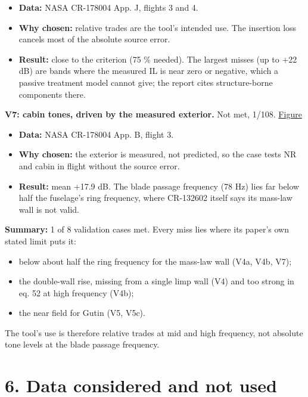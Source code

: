 \documentclass[10pt,a4paper]{article}
\begin{document}
\begin{itemize}
\item \textbf{Data:} NASA CR-178004 App. J, flights 3 and 4.
\item \textbf{Why chosen:} relative trades are the tool's intended use. The insertion loss cancels most of the absolute source error.
\item \textbf{Result:} close to the criterion (75 \% needed). The largest misses (up to +22 dB) are bands where the measured IL is near zero or negative, which a passive treatment model cannot give; the report cites structure-borne components there.
\end{itemize}

\textbf{V7: cabin tones, driven by the measured exterior.} Not met, 1/108. \href{../figures/V7.png}{Figure}

\begin{itemize}
\item \textbf{Data:} NASA CR-178004 App. B, flight 3.
\item \textbf{Why chosen:} the exterior is measured, not predicted, so the case tests NR and cabin in flight without the source error.
\item \textbf{Result:} mean +17.9 dB. The blade passage frequency (78 Hz) lies far below half the fuselage's ring frequency, where CR-132602 itself says its mass-law wall is not valid.
\end{itemize}

\textbf{Summary:} 1 of 8 validation cases met. Every miss lies where its paper's own stated limit puts it:

\begin{itemize}
\item below about half the ring frequency for the mass-law wall (V4a, V4b, V7);
\item the double-wall rise, missing from a single limp wall (V4) and too strong in eq. 52 at high frequency (V4b);
\item the near field for Gutin (V5, V5c).
\end{itemize}

The tool's use is therefore relative trades at mid and high frequency, not absolute tone levels at the blade passage frequency.

\section*{6. Data considered and not used}
\end{document}
